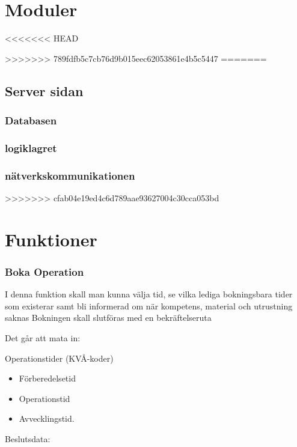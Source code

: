 \documentclass[a4paper,10pt]{article}
\begin{document}
\section{Moduler}
<<<<<<< HEAD

>>>>>>> 789fdfb5c7cb76d9b015eec62053861e4b5c5447
=======
    \subsection{Server sidan}
        \subsubsection{Databasen}
        \subsubsection{logiklagret}
        \subsubsection{nätverkskommunikationen}
        
>>>>>>> cfab04e19ed4c6d789aae93627004c30cca053bd
\section{Funktioner}

    \subsubsection{Boka Operation}

I denna funktion skall man kunna välja tid, se vilka lediga bokningsbara tider som existerar samt bli informerad om när kompetens, material och utrustning saknas
Bokningen skall slutföras med en bekräftelseruta

Det går att mata in:

Operationstider (KVÅ-koder)
\begin{itemize}
	\item Förberedelsetid
	\item Operationstid
	\item Avvecklingstid.
\end{itemize}

Beslutsdata:
\end{document}
